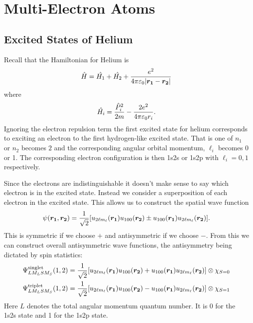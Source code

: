     \section{Multi-Electron Atoms}
    \subsection{Excited States of Helium}
    Recall that the Hamiltonian for Helium is
    \[\hat{H} = \hat{H_1} + \hat{H_2} + \frac{e^2}{4\pi\varepsilon_0\abs{\bm{r_1} - \bm{r_2}}}\]
    where
    \[\hat{H_i} = \frac{\hat{P}_i^2}{2m} - \frac{2e^2}{4\pi\varepsilon_0r_i}.\]
    Ignoring the electron repulsion term the first excited state for helium corresponds to exciting an electron to the first hydrogen-like excited state.
    That is one of \(n_1\) or \(n_2\) becomes \(2\) and the corresponding angular orbital momentum, \(\ell_i\) becomes 0 or 1.
    The corresponding electron configuration is then 1s2s or 1s2p with \(\ell_i = 0, 1\) respectively.
    
    Since the electrons are indistinguishable it doesn't make sense to say which electron is in the excited state.
    Instead we consider a superposition of each electron in the excited state.
    This allows us to construct the spatial wave function
    \[\psi(\bm{r_1}, \bm{r_2}) = \frac{1}{\sqrt{2}} [u_{2\ell m_\ell}(\bm{r_1})u_{100}(\bm{r_2}) \pm u_{100}(\bm{r_1})u_{2\ell m_\ell}(\bm{r_2})].\]
    This is symmetric if we choose \(+\) and antisymmetric if we choose \(-\).
    From this we can construct overall antisymmetric wave functions, the antisymmetry being dictated by spin statistics:
    \begin{align*}
        \Psi_{LM_LSM_S}^{\text{singlet}}(1, 2) &= \frac{1}{\sqrt{2}} [u_{2\ell m_\ell}(\bm{r_1})u_{100}(\bm{r_2}) + u_{100}(\bm{r_1})u_{2\ell m_\ell}(\bm{r_2})] \otimes \chi_{S = 0}\\
        \Psi_{LM_LSM_S}^{\text{triplet}}(1, 2) &= \frac{1}{\sqrt{2}} [u_{2\ell m_\ell}(\bm{r_1})u_{100}(\bm{r_2}) - u_{100}(\bm{r_1})u_{2\ell m_\ell}(\bm{r_2})] \otimes \chi_{S=1}
    \end{align*}
    Here \(L\) denotes the total angular momentum quantum number.
    It is \(0\) for the 1s2s state and 1 for the 1s2p state.
    
